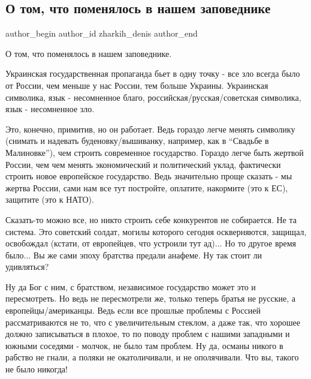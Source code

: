  
 
 
 
 
 
\subsection{О том, что поменялось в нашем заповеднике}
\label{sec:30_10_2021.fb.zharkih_denis.1.zapovednik}
 
\ifcmt
 author_begin
   author_id zharkih_denis
 author_end
\fi

О том, что поменялось в нашем заповеднике. 

Украинская государственная пропаганда бьет в одну точку - все зло всегда было
от России, чем меньше у нас России, тем больше Украины. Украинская символика,
язык - несомненное благо, российская/русская/советская символика, язык -
несомненное зло. 


Это, конечно, примитив, но он работает. Ведь гораздо легче менять символику
(снимать и надевать буденовку/вышиванку, например, как в \enquote{Свадьбе в
Малиновке}), чем строить современное государство. Гораздо легче быть жертвой
России, чем чем менять экономический и политический уклад, фактически строить
новое европейское государство. Ведь значительно проще сказать - мы жертва
России, сами нам все тут постройте, оплатите, накормите (это к ЕС), защитите
(это к НАТО). 

Сказать-то можно все, но никто строить себе конкурентов не собирается. Не та
система. Это советский солдат, могилы которого сегодня оскверняются, защищал,
освобождал (кстати, от европейцев, что устроили тут ад)... Но то другое время
было... Вы же сами эпоху братства предали анафеме. Ну так стоит ли удивляться? 

Ну да Бог с ним, с братством, независимое государство может это и пересмотреть.
Но ведь не пересмотрели же, только теперь братья не русские, а
европейцы/американцы. Ведь если все прошлые проблемы с Россией рассматриваются
не то, что с увеличительным стеклом, а даже так, что хорошее должно
записываться в плохое, то по поводу проблем с нашими западными и южными
соседями - молчок, не было там проблем. Ну да, османы никого в рабство не
гнали, а поляки не окатоличивали, и не ополячивали. Что вы, такого не было
никогда!

